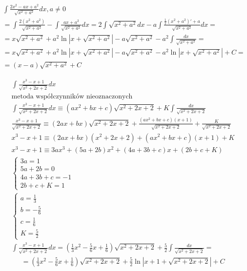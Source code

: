 
\begin{gather*}
  \int \frac{2x^2-ax+a^2}{\sqrt{x^2+a^2}}dx, a\neq 0 \\
  = \int \frac{2(x^2+a^2)}{\sqrt{x^2+a^2}}-\int \frac{ax+a^2}{\sqrt{x^2+a^2}}dx
  = 2\int \sqrt{x^2+a^2}dx-a\int \frac{\frac{1}{2}(x^2+a^2)'+a}{\sqrt{x^2+a^2}}dx = \\
  = x\sqrt{x^2+a^2} +a^2\ln|x+\sqrt{x^2+a^2}|-a\sqrt{x^2+a^2}-a^2\int \frac{dx}{\sqrt{x^2+a^2}} = \\
  = x\sqrt{x^2+a^2} +a^2\ln|x+\sqrt{x^2+a^2}|-a\sqrt{x^2+a^2}-a^2\ln|x+\sqrt{x^2+a^2}|+C = \\
  = (x-a)\sqrt{x^2+a^2}+C
\end{gather*}


\begin{gather*}
  \int \frac{x^3-x+1}{\sqrt{x^2+2x+2}}dx \\
  \text{metoda współczynników nieoznaczonych} \\
  \int \frac{x^3-x+1}{\sqrt{x^2+2x+2}}dx \equiv (ax^2+bx+c)\sqrt{x^2+2x+2}+K\int \frac{dx}{\sqrt{x^2+2x+2}} \\
\frac{x^3-x+1}{\sqrt{x^2+2x+2}} \equiv (2ax+bx)\sqrt{x^2+2x+2}+\frac{(ax^2+bx+c)(x+1)}{\sqrt{x^2+2x+2}}+ \frac{K}{\sqrt{x^2+2x+2}} \\
x^3-x+1 \equiv (2ax+bx)(x^2+2x+2)+(ax^2+bx+c)(x+1)+K \\
x^3-x+1 \equiv 3ax^3+(5a+2b)x^2+(4a+3b+c)x+(2b+c+K) \\
\begin{cases} 3a=1 \\ 5a+2b=0 \\ 4a+3b+c=-1 \\ 2b+c+K=1 \end{cases} \\
\begin{cases} a=\frac{1}{3} \\ b=-\frac{5}{6} \\ c=\frac{1}{6} \\ K=\frac{5}{2} \end{cases} \\
\int \frac{x^3-x+1}{\sqrt{x^2+2x+2}}dx = (\frac{1}{3}x^2-\frac{5}{6}x+\frac{1}{6})\sqrt{x^2+2x+2}+ \frac{5}{2}\int \frac{dx}{\sqrt{x^2+2x+2}} = \end{gather*}
\begin{gather*}= (\frac{1}{3}x^2-\frac{5}{6}x+\frac{1}{6})\sqrt{x^2+2x+2}+ \frac{5}{2}\ln|x+1+\sqrt{x^2+2x+2}|+C
\end{gather*}

